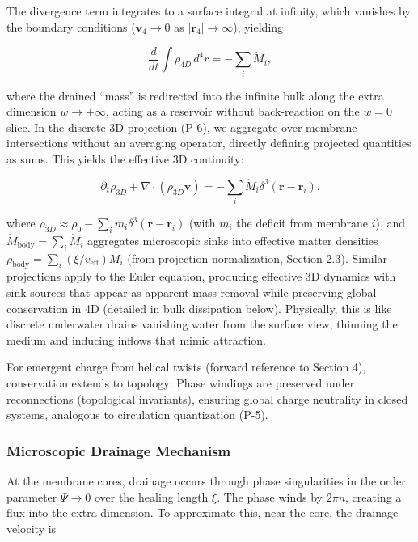 The divergence term integrates to a surface integral at infinity, which vanishes by the boundary conditions ($\mathbf{v}_4 \to 0$ as $|\mathbf{r}_4| \to \infty$), yielding

\begin{equation}
\frac{d}{dt} \int \rho_{4D} \, d^4 r = -\sum_i \dot{M}_i,
\end{equation}

where the drained ``mass'' is redirected into the infinite bulk along the extra dimension $w \to \pm \infty$, acting as a reservoir without back-reaction on the $w=0$ slice. In the discrete 3D projection (P-6), we aggregate over membrane intersections without an averaging operator, directly defining projected quantities as sums. This yields the effective 3D continuity:

\begin{equation}
\partial_t \rho_{3D} + \nabla \cdot (\rho_{3D} \mathbf{v}) = -\sum_i \dot{M}_i \delta^3(\mathbf{r} - \mathbf{r}_i).
\end{equation}

where $\rho_{3D} \approx \rho_0 - \sum_i m_i \delta^3(\mathbf{r} - \mathbf{r}_i)$ (with $m_i$ the deficit from membrane $i$), and $\dot{M}_{\text{body}} = \sum_i \dot{M}_i$ aggregates microscopic sinks into effective matter densities $\rho_{\text{body}} = \sum_i (\xi / v_{\text{eff}}) \dot{M}_i$ (from projection normalization, Section 2.3). Similar projections apply to the Euler equation, producing effective 3D dynamics with sink sources that appear as apparent mass removal while preserving global conservation in 4D (detailed in bulk dissipation below). Physically, this is like discrete underwater drains vanishing water from the surface view, thinning the medium and inducing inflows that mimic attraction.

For emergent charge from helical twists (forward reference to Section 4), conservation extends to topology: Phase windings are preserved under reconnections (topological invariants), ensuring global charge neutrality in closed systems, analogous to circulation quantization (P-5).

\subsubsection{Microscopic Drainage Mechanism}
At the membrane cores, drainage occurs through phase singularities in the order parameter $\Psi \to 0$ over the healing length $\xi$. The phase winds by $2\pi n$, creating a flux into the extra dimension. To approximate this, near the core, the drainage velocity is

